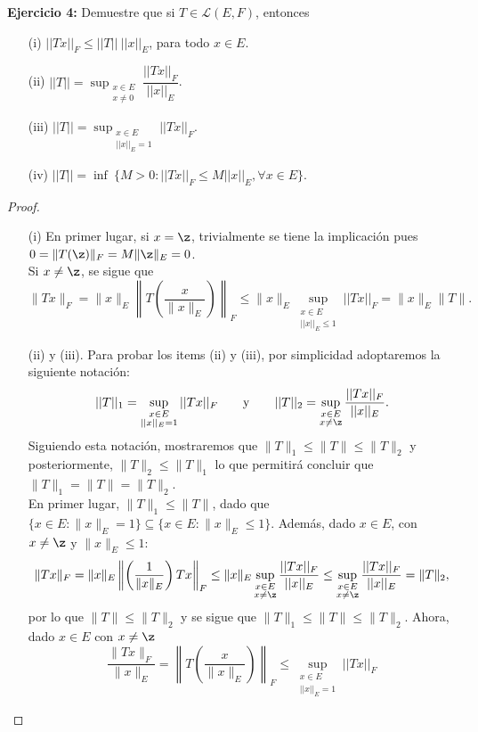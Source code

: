 \textbf{Ejercicio 4:} Demuestre que si $T\in \mathcal{L}(E, F)$, entonces
\begin{itemize}
    \item[(i)] $||Tx||_F \leq ||T||\ ||x||_E$, para todo $x\in E$.
    \item[(ii)] $||T|| = \displaystyle\sup_{\substack{x\in E\\ x\neq 0}}\dfrac{||Tx||_F}{||x||_E}$.
    \item[(iii)] $||T||=\displaystyle\sup_{\substack{x\in E\\ ||x||_E=1}}||Tx||_F$.
    \item[(iv)] $||T|| = \inf\ \{M > 0: ||Tx||_F \leq M ||x||_E, \forall x\in E\}$.
\end{itemize}

\begin{proof}
\begin{enumerate}
    \item[(i)] En primer lugar, si $x=\z$, trivialmente se tiene la implicación pues $0=\|T(\z)\|_F= M\|\z\|_E=0$. \\
    Si $x\neq \z$, se sigue que
    \[\|Tx\|_F=\|x\|_E\left\|T\left(\frac{x}{\|x\|_E}\right)\right\|_F\leq\|x\|_E\displaystyle\sup_{\substack{x\in E\\ ||x||_E\leq1}}||Tx||_F=\|x\|_E\|T\|.\]
    \item[(ii)] y (iii). Para probar los items (ii) y (iii), por simplicidad adoptaremos la siguiente notación:
    \[||T||_1=\displaystyle\sup_{\substack{x\in E\\ ||x||_E=1}}||Tx||_F \qquad \text{y} \qquad ||T||_2 = \displaystyle\sup_{\substack{x\in E\\ x\neq \z}}\dfrac{||Tx||_F}{||x||_E}.\]
    Siguiendo esta notación, mostraremos que $\|T\|_1\leq \|T\|\leq \|T\|_2$ y posteriormente, $\|T\|_2\leq \|T\|_1$ lo que permitirá concluir que $\|T\|_1=\|T\|=\|T\|_2$. \\
    En primer lugar, $\|T\|_1\leq \|T\|$, dado que $\{x\in E: \|x\|_E=1\}\subseteq\{x\in E: \|x\|_E\leq 1\}$. Además, dado $x\in E$, con $x\neq \z$ y $\|x\|_E\leq 1$:
    \[
    \|Tx\|_F=\|x\|_E\left\|\left(\frac{1}{\|x\|_E}\right)Tx\right\|_F\leq\|x\|_E\displaystyle\sup_{\substack{x\in E\\ x\neq \z}}\dfrac{||Tx||_F}{||x||_E}\leq \displaystyle\sup_{\substack{x\in E\\ x\neq \z}}\dfrac{||Tx||_F}{||x||_E}=\|T\|_2,
    \]
    por lo que $\|T\|\leq \|T\|_2$ y se sigue que $\|T\|_1\leq \|T\|\leq \|T\|_2$. Ahora, dado $x\in E$ con $x\neq\z$
    \[
    \frac{\|Tx\|_F}{\|x\|_E}=\left\|T\left(\frac{x}{\|x\|_E}\right)\right\|_F\leq \displaystyle\sup_{\substack{x\in E\\ ||x||_E=1}}||Tx||_F
\]
\end{enumerate}
\end{proof}
